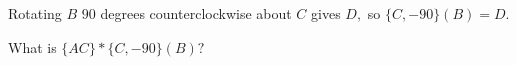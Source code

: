 











Rotating $B$ $90$ degrees counterclockwise about $C$ gives $D,$ so $\{C,-90\} (B) = D.$

What is $\{AC\} * \{C,-90\} (B)?$













